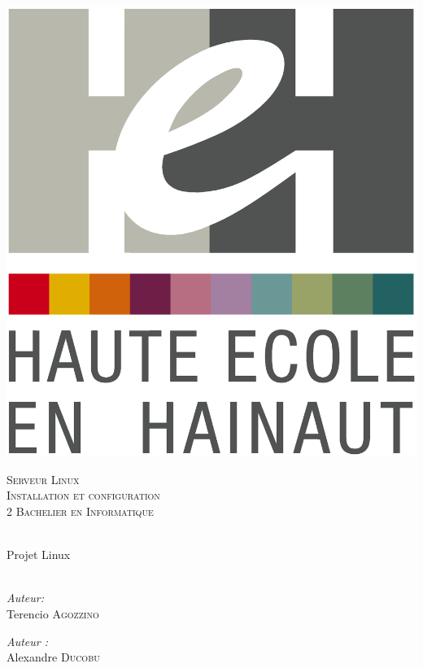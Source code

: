 \begin{center}
  \includegraphics[scale=0.12]{textures/logo/heh.eps}

  \vspace{1cm}

  \textsc{\LARGE Serveur Linux} \\ [0.5cm]
  \textsc{\Large Installation et configuration} \\ [0.5cm]

  \textsc{\large 2 Bachelier en Informatique} \\ [0.2cm]

  \begingroup
   \selectfont 

  \HRule \\ [0.4cm] {
    \huge Projet Linux \\ [0.2cm] 
  }
  \HRule \\ [1.3cm]
  \endgroup

  \begin{minipage}[t]{0.4 \textwidth} 
    \begin{flushleft} 
      \large \emph{Auteur:} \\ 
      Terencio \textsc{Agozzino}
    \end{flushleft} 
  \end{minipage}
  \begin{minipage}[t]{0.4 \textwidth}
    \begin{flushright} 
      \large \emph{Auteur :} \\ 
      Alexandre \textsc{Ducobu}
    \end{flushright} 
  \end{minipage}


\end{center}
